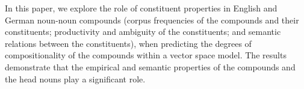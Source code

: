 In this paper, we explore the role of constituent properties in English and German noun-noun compounds (corpus frequencies of the compounds and their constituents; productivity and ambiguity of the constituents; and semantic relations between the constituents), when predicting the degrees of compositionality of the compounds within a vector space model. The results demonstrate that the empirical and semantic properties of the compounds and the head nouns play a significant role.
